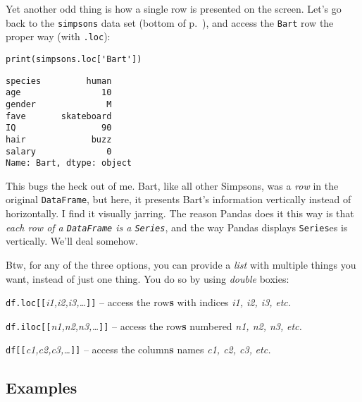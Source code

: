 Yet another odd thing is how a single row is presented on the screen. Let's go
back to the \texttt{simpsons} data set (bottom of p.~\pageref{finalSimpsons}),
and access the \texttt{Bart} row the proper way (with \texttt{.loc}):

\begin{Verbatim}[fontsize=\small,samepage=true,frame=single,framesep=3mm]
print(simpsons.loc['Bart'])
\end{Verbatim}
\vspace{-.2in}

\begin{Verbatim}[fontsize=\small,samepage=true,frame=leftline,framesep=5mm,framerule=1mm]
species         human
age                10
gender              M
fave       skateboard
IQ                 90
hair             buzz
salary              0
Name: Bart, dtype: object
\end{Verbatim}

This bugs the heck out of me. Bart, like all other Simpsons, was a \textit{row}
in the original \texttt{DataFrame}, but here, it presents Bart's information
vertically instead of horizontally. I find it visually jarring. The reason
Pandas does it this way is that \textit{each row of a \texttt{DataFrame} is a
\texttt{Series}}, and the way Pandas displays \texttt{Series}es is vertically.
We'll deal somehow.


Btw, for any of the three options, you can provide a \textit{list} with
multiple things you want, instead of just one thing. You do so by using
\textit{double} boxies:

\begin{compactitem}
\item \texttt{df.loc[[}\textsl{i1,i2,i3,\dots}\texttt{]]} -- access the
row\textbf{s} with indices \textsl{i1, i2, i3,} \textit{etc.}
\item \texttt{df.iloc[[}\textsl{n1,n2,n3,\dots}\texttt{]]} -- access the row\textbf{s}
numbered \textsl{n1, n2, n3,} \textit{etc.}
\item \texttt{df[[}\textsl{c1,c2,c3,\dots}\texttt{]]} -- access the
column\textbf{s} names \textsl{c1, c2, c3,} \textit{etc.}
\end{compactitem}

\subsection{Examples}


